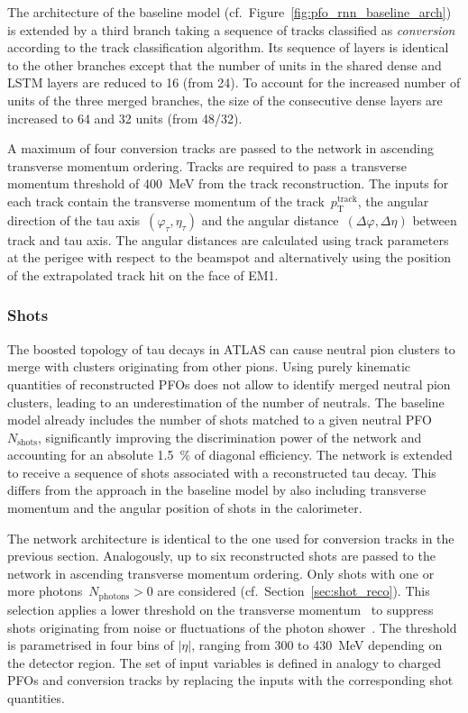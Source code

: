 The architecture of the baseline model (cf.\
Figure~\ref{fig:pfo_rnn_baseline_arch}) is extended by a third branch taking a
sequence of tracks classified as \emph{conversion} according to the track
classification algorithm. Its sequence of layers is identical to the other
branches except that the number of units in the shared dense and LSTM layers are
reduced to 16 (from 24). To account for the increased number of units of the
three merged branches, the size of the consecutive dense layers are increased to
64 and 32 units (from 48/32).

A maximum of four conversion tracks are passed to the network in ascending
transverse momentum ordering. Tracks are required to pass a transverse momentum
threshold of \SI{400}{\MeV} from the track reconstruction. The inputs for each
track contain the transverse momentum of the track~$p_\text{T}^\text{track}$,
the angular direction of the tau axis~$(\varphi_\tau, \eta_\tau)$ and the
angular distance~$(\Delta\varphi, \Delta\eta)$ between track and tau axis. The
angular distances are calculated using track parameters at the perigee with
respect to the beamspot and alternatively using the position of the extrapolated
track hit on the face of EM1.

\subsubsection{Shots}

The boosted topology of tau decays in ATLAS can cause neutral pion clusters to
merge with clusters originating from other pions. Using purely kinematic
quantities of reconstructed PFOs does not allow to identify merged neutral pion
clusters, leading to an underestimation of the number of neutrals. The baseline
model already includes the number of shots matched to a given neutral
PFO~$N_\text{shots}$, significantly improving the discrimination power of the
network and accounting for an absolute \SI{1.5}{\percent} of diagonal
efficiency. The network is extended to receive a sequence of shots associated
with a reconstructed tau decay. This differs from the approach in the baseline
model by also including transverse momentum and the angular position of shots in
the calorimeter.

The network architecture is identical to the one used for conversion tracks in
the previous section. Analogously, up to six reconstructed shots are passed to
the network in ascending transverse momentum ordering. Only shots with one or
more photons~$N_\text{photons} > 0$ are considered (cf.\
Section~\ref{sec:shot_reco}). This selection applies a lower threshold on the
transverse momentum~\smash{$p_\text{T}^\text{shot}$} to suppress shots
originating from noise or fluctuations of the photon
shower~\cite{atlas:taurec:decaymodes}. The threshold is parametrised in four
bins of $|\eta|$, ranging from \num{300} to \SI{430}{\MeV} depending on the
detector region.
The set of input variables is defined in analogy to charged PFOs and conversion
tracks by replacing the inputs with the corresponding shot quantities.

